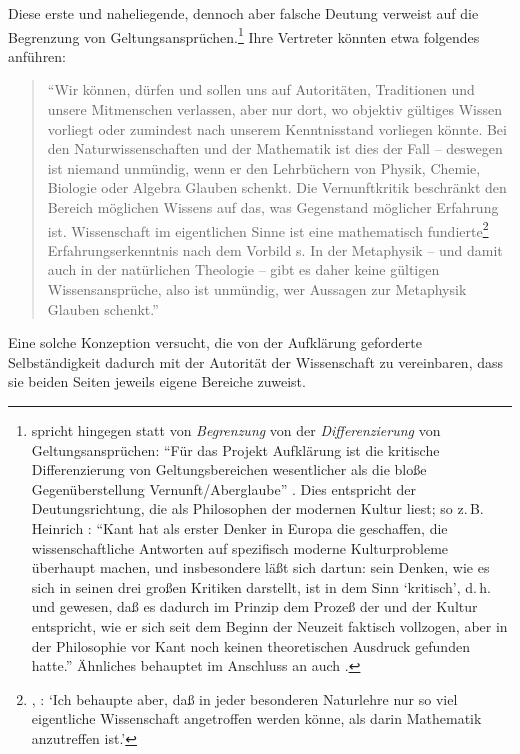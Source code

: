 Diese erste und naheliegende, dennoch aber falsche Deutung verweist
auf die Begrenzung von
Geltungsansprüchen.\footnote{
spricht hingegen statt von \emph{Begrenzung} von der \emph{Differenzierung} von
Geltungsansprüchen: \enquote{Für das Projekt Aufklärung ist die kritische
Differenzierung von Geltungsbereichen wesentlicher als die bloße Gegenüberstellung
Vernunft/Aberglaube} \parencite[135]{LaRocca:WasAufklaerungseinwird2004}. Dies
entspricht der Deutungsrichtung, die  als Philosophen der modernen Kultur liest; so z.\,B.
Heinrich \textcite[][141]{Rickert:KantalsPhilosophdermodernenKultur1924}:
\enquote{Kant hat als erster Denker in Europa die 
geschaffen, die wissenschaftliche Antworten auf spezifisch moderne
Kulturprobleme überhaupt  machen, und insbesondere läßt sich dartun: sein
Denken, wie es sich in seinen drei großen Kritiken darstellt, ist in dem Sinn
\enquote{kritisch}, d.\,h.  und  gewesen,
daß es dadurch im Prinzip dem Prozeß der  und  der Kultur
entspricht, wie er sich seit dem Beginn der Neuzeit faktisch vollzogen, aber in
der Philosophie vor Kant noch keinen theoretischen Ausdruck gefunden hatte.}
Ähnliches behauptet im Anschluss an  auch
\textcite[vgl.][838]{Schnaedelbach:WirKantianer2005}.} Ihre Vertreter könnten
etwa folgendes anführen:
\begin{quote}
\enquote{Wir können, dürfen und sollen uns auf Autoritäten, Traditionen und unsere
Mitmenschen verlassen, aber nur dort, wo objektiv gültiges Wissen vorliegt oder
zumindest nach unserem Kenntnisstand vorliegen könnte. Bei den
Naturwissenschaften und der Mathematik ist dies der Fall -- deswegen ist niemand
unmündig, wenn er den Lehrbüchern von Physik, Chemie, Biologie oder Algebra
Glauben schenkt. Die Vernunftkritik beschränkt den Bereich möglichen Wissens auf das, was Gegenstand
möglicher Erfahrung ist. Wissenschaft im eigentlichen Sinne ist eine
mathematisch fundierte\footnote{\cite[Vgl.][A
viii]{Kant:MetaphysischeAnfangsgruendederNaturwissenschaften1977}, \cite[IV:
470.13--15]{Kant:GesammelteWerke1900ff.}: \enquote{Ich behaupte aber, daß in
jeder besonderen Naturlehre nur so viel eigentliche Wissenschaft angetroffen
werden könne, als darin Mathematik anzutreffen ist.}} Erfahrungserkenntnis nach
dem Vorbild s. In der Metaphysik -- und damit auch in der
natürlichen Theologie -- gibt es daher keine gültigen Wissensansprüche, also ist
unmündig, wer Aussagen zur Metaphysik Glauben schenkt.}
\end{quote}
Eine solche Konzeption versucht, die von der Aufklärung geforderte Selbständigkeit
dadurch mit der Autorität der Wissenschaft zu vereinbaren, dass sie beiden
Seiten jeweils eigene Bereiche zuweist.


